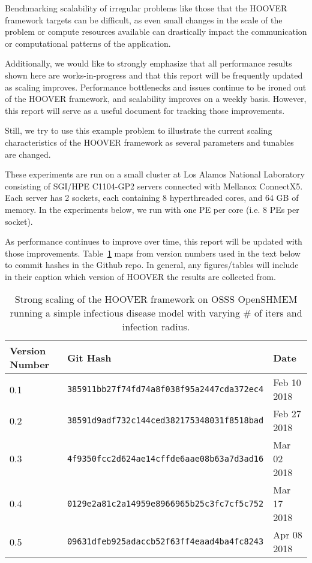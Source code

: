 Benchmarking scalability of irregular problems like those that the HOOVER
framework targets can be difficult, as even small changes in the scale of the
problem or compute resources available can drastically impact the communication
or computational patterns of the application.

Additionally, we would like to strongly emphasize that all performance results shown here
are works-in-progress and that this report will be frequently updated as scaling
improves. Performance bottlenecks and issues continue to be ironed
out of the HOOVER framework, and scalability improves on a weekly basis.
However, this report will serve as a useful document for tracking those
improvements.

Still, we try to use this example problem to illustrate the current scaling
characteristics of the HOOVER framework as several parameters and tunables are
changed.

These experiments are run on a small cluster at Los Alamos National Laboratory
consisting of SGI/HPE C1104-GP2 servers connected with Mellanox ConnectX5.
Each server has 2 sockets, each containing 8 hyperthreaded cores, and 64 GB of
memory. In the experiments below, we run with one PE per core (i.e. 8 PEs per
socket).

As performance continues to improve over time, this report will be updated with
those improvements. Table~\ref{tab:hoover_versions} maps from version numbers used in the text
below to commit hashes in the Github repo. In general, any figures/tables will
include in their caption which version of HOOVER the results are collected from.

\begin{table}
\centering
\begin{tabular}{ | l | l | l | }
\hline
\textbf{Version Number} & \textbf{Git Hash}                         & \textbf{Date} \\\hline
0.1                     & \texttt{385911bb27f74fd74a8f038f95a2447cda372ec4} & Feb 10 2018 \\\hline
0.2                     & \texttt{38591d9adf732c144ced382175348031f8518bad} & Feb 27 2018 \\\hline
0.3                     & \texttt{4f9350fcc2d624ae14cffde6aae08b63a7d3ad16} & Mar 02 2018 \\\hline
0.4                     & \texttt{0129e2a81c2a14959e8966965b25c3fc7cf5c752} & Mar 17 2018 \\\hline
0.5                     & \texttt{09631dfeb925adaccb52f63ff4eaad4ba4fc8243} & Apr 08 2018 \\\hline
\end{tabular}
\caption{Strong scaling of the HOOVER framework on OSSS OpenSHMEM running a
    simple infectious disease model with varying \# of iters and infection
    radius.}
\label{tab:hoover_versions}
\end{table}


